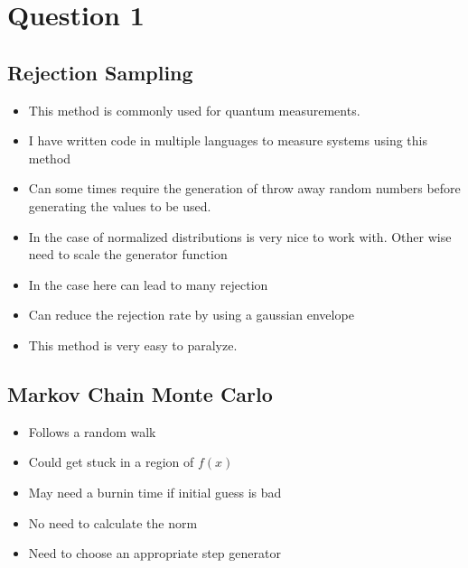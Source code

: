 \documentclass{article}
\begin{document}
\section{Question 1}

\subsection{Rejection Sampling}

\begin{itemize}
\itemsep-0.3cm 
\item This method is commonly used for quantum measurements.\citep{Rivas2011} \\
\item I have written code in multiple languages to measure systems using this method \\
\item Can some times require the generation of throw away random numbers before generating the values to be used. \\
\item In the case of normalized distributions is very nice to work with. Other wise need to scale the generator function \citep{JakeRS}\\
\item In the case here can lead to many rejection \\
\item Can reduce the rejection rate by using a gaussian envelope \citep{RelSRS}\\
\item This method is very easy to paralyze. \\
\end{itemize}




\subsection{Markov Chain Monte Carlo}

\begin{itemize}
\itemsep-0.3cm 
\item Follows a random walk\citep{robert2016metropolishastingsalgorithm} \\
\item Could get stuck in a region of $f(x)$ \\
\item May need a burnin time if initial guess is bad\citep{DMHA}\\
\item No need to calculate the norm\\ 
\item Need to choose an appropriate step generator \\
\end{itemize}
\end{document}

